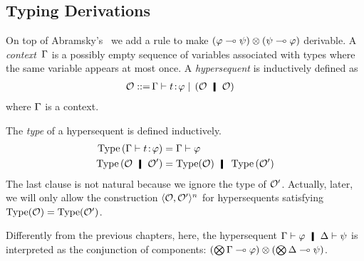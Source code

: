 \subsection{Typing Derivations}

On top of Abramsky's~\citep{abramsky1993computational} we add a rule to
make $(\varphi\multimap\psi)\otimes(\psi\multimap\varphi)$ derivable.
A \textit{context}~$\Gamma$ is a possibly empty sequence of
variables associated with
types where the same variable appears at most once.
A \textit{hypersequent} is inductively defined as
\begin{align*}
 \hypert ::=\, &\G\tr\tj{t}{\phi}
 \mid\, (\hypert\hmid \hypert)
\end{align*}
where $\Gamma$ is a context.

The \textit{type} of a hypersequent is
defined inductively.
\begin{align*}
 \type{(\G\tr\tj{t}\phi)}&= \G\tr\phi \\
 \type{(\hypert \hmid \hypert')}&= \type(\hypert)\hmid\type{(\hypert')}
\end{align*}
The last clause is not natural because we ignore the type of $\mathcal{O}'$.
Actually, later, we will only allow the construction
$\langle{\mathcal{O},\mathcal{O}'}\rangle^n$ for hypersequents satisfying
$\operatorname{Type}(\mathcal{O}) = \operatorname{Type}(\mathcal{O}')$.

Differently from the previous chapters,
here, the hypersequent $\G\tr\phi\hmid \D\tr\psi$ is interpreted as the
conjunction of components:
$(\bigotimes\Gamma\multimap\varphi)\otimes (\bigotimes\Delta\multimap\psi)$.

